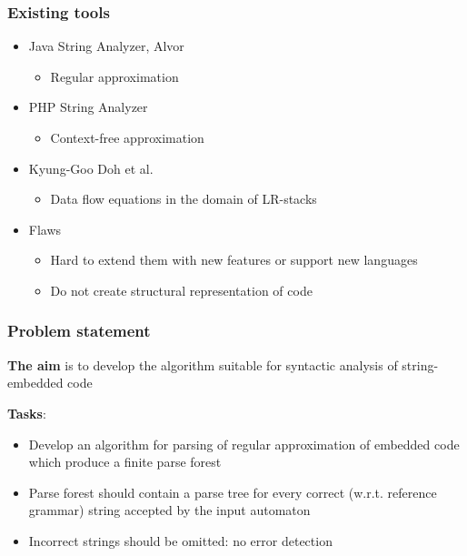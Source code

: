 \documentclass{beamer}
\begin{document}
\begin{frame}
  \transwipe[direction=90]
  \frametitle{Existing tools}
  \begin{itemize}
    \item Java String Analyzer, Alvor
    \begin{itemize}
      \item Regular approximation
    \end{itemize}
    \item PHP String Analyzer
    \begin{itemize}
      \item Context-free approximation
    \end{itemize}
    \item Kyung-Goo Doh et al.
    \begin{itemize}
      \item Data flow equations in the domain of LR-stacks
    \end{itemize}
  \end{itemize}
  
  \begin{itemize}
    \item Flaws
    \begin{itemize}
      \item Hard to extend them with new features or support new languages
      \item Do not create structural representation of code
    \end{itemize}
  \end{itemize}
\end{frame}

\begin{frame}
  \transwipe[direction=90]
  \frametitle{Problem statement}
  \textbf{The aim} is to develop the algorithm suitable for syntactic analysis of string-embedded code  
  
  \textbf{Tasks}:
  \begin{itemize}
    \item Develop an algorithm for parsing of regular approximation of embedded 
code which produce a finite parse forest
    \item Parse forest should contain a parse tree for every correct (w.r.t. 
reference grammar) string accepted by the input automaton
    \item Incorrect strings should be omitted: no error detection
  \end{itemize}
\end{frame}
            
\end{document}
